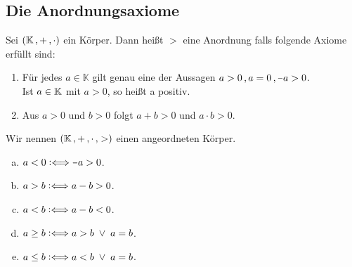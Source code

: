 \documentclass[../ana1.tex]{subfiles}
\begin{document}
\subsection{Die Anordnungsaxiome}
\setcounter{satz}{-1} %

\begin{defi}
	Sei \((\mathbb{K} \operatorname{,} + \operatorname{,} \cdot) \) ein Körper.
	Dann heißt \(> \) eine Anordnung falls folgende Axiome erfüllt sind:
	\begin{enumerate}[label= (A\arabic*)]
		\item\label{ax:A1}Für jedes \(a \in \mathbb{K} \) gilt genau eine der Aussagen \(a > 0 \ko a = 0 \ko \minus a > 0 \). \\
		      Ist \(a \in \mathbb{K} \) mit \(a > 0 \), so heißt a positiv.
		\item\label{ax:A2}Aus \(a>0 \) und \(b>0 \) folgt \(a + b > 0 \) und \(a \cdot b > 0 \).
	\end{enumerate}
	Wir nennen \((\mathbb{K} \operatorname{,} + \operatorname{,} \cdot \operatorname{,} >) \) einen angeordneten Körper.
\end{defi}

\begin{notation}\leavevmode
	\begin{enumerate}[(a)]
		\item \(a < 0 \longeq \minus a > 0 \).
		\item \(a > b \mathrel{\vcentcolon\Longleftrightarrow} a - b > 0 \). \qquad \qquad \quad {}
		\item \(a < b \mathrel{\vcentcolon\Longleftrightarrow} a - b < 0 \).
		\item \(a \geq b \mathrel{\vcentcolon\Longleftrightarrow} a > b  \; \vee  \;  a = b \).
		\item \(a \leq b \mathrel{\vcentcolon\Longleftrightarrow} a < b  \; \vee  \;  a = b \).
	\end{enumerate}
\end{notation}
\end{document}
